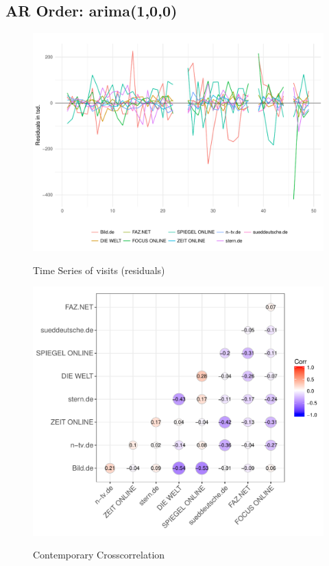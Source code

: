 \documentclass[12pt,a4paper,notitlepage]{article}
\begin{document}
\subsection{AR Order: arima(1,0,0)}

\begin{figure}[H]\centering
\caption{Time Series of visits (residuals)}
	\includegraphics[scale=.6]{../figs/resid_news1}
	\label{}
\end{figure}

\begin{figure}[H]\centering
\caption{Contemporary Crosscorrelation}
	\includegraphics[scale=.7]{../figs/ccf_news}
	\label{}
\end{figure}
\end{document}

